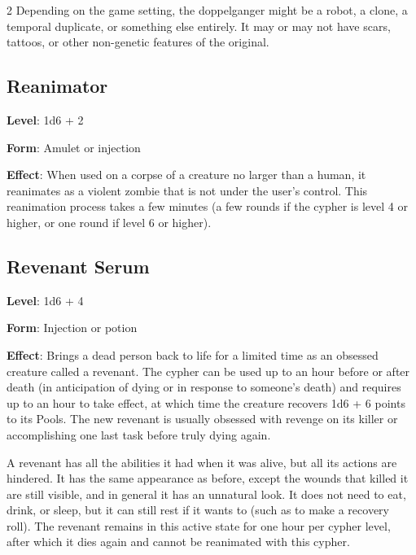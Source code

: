 \begin{multicols}{2}
Depending on the game setting, the doppelganger might be a robot, a clone, a temporal duplicate, or something else entirely. It may or may not have scars, tattoos, or other non-genetic features of the original.

\subsection{Reanimator}

\textbf{Level}: 1d6 + 2

\textbf{Form}: Amulet or injection

\textbf{Effect}: When used on a corpse of a creature no larger than a human, it reanimates as a violent zombie that is not under the user’s control. This reanimation process takes a few minutes (a few rounds if the cypher is level 4 or higher, or one round if level 6 or higher).

\subsection{Revenant Serum}

\textbf{Level}: 1d6 + 4

\textbf{Form}: Injection or potion

\textbf{Effect}: Brings a dead person back to life for a limited time as an obsessed creature called a revenant. The cypher can be used up to an hour before or after death (in anticipation of dying or in response to someone’s death) and requires up to an hour to take effect, at which time the creature recovers 1d6 + 6 points to its Pools. The new revenant is usually obsessed with revenge on its killer or accomplishing one last task before truly dying again.

A revenant has all the abilities it had when it was alive, but all its actions are hindered. It has the same appearance as before, except the wounds that killed it are still visible, and in general it has an unnatural look. It does not need to eat, drink, or sleep, but it can still rest if it wants to (such as to make a recovery roll). The revenant remains in this active state for one hour per cypher level, after which it dies again and cannot be reanimated with this cypher.


\end{multicols}
